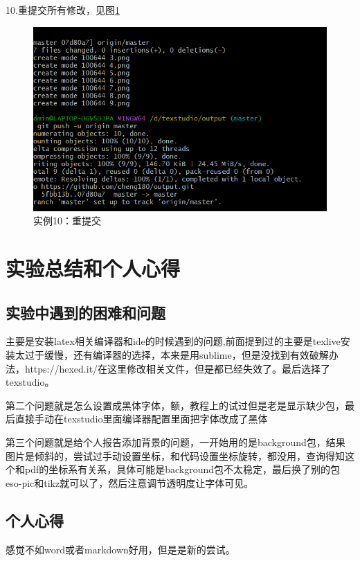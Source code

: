 \documentclass{article}
\begin{document}
	\newpage
	
	10.重提交所有修改，见图\ref{fig:example22}
	
		\begin{figure}[h]  
		\centering
		\includegraphics[width=1\textwidth]{10.png}
		\caption{实例10：重提交}
		\label{fig:example22}
	\end{figure}
	
	\newpage
	\section{实验总结和个人心得}
	\subsection{实验中遇到的困难和问题}
	主要是安装latex相关编译器和ide的时候遇到的问题,前面提到过的主要是texlive安装太过于缓慢，还有编译器的选择，本来是用sublime，但是没找到有效破解办法，https://hexed.it/在这里修改相关文件，但是都已经失效了。最后选择了texstudio。
	
	第二个问题就是怎么设置成黑体字体，额，教程上的试过但是老是显示缺少包，最后直接手动在texstudio里面编译器配置里面把字体改成了黑体
	
	第三个问题就是给个人报告添加背景的问题，一开始用的是background包，结果图片是倾斜的，尝试过手动设置坐标，和代码设置坐标旋转，都没用，查询得知这个和pdf的坐标系有关系，具体可能是background包不太稳定，最后换了别的包eso-pic和tikz就可以了，然后注意调节透明度让字体可见。
	
	\subsection{个人心得}
	
	感觉不如word或者markdown好用，但是是新的尝试。
	
\end{document}
